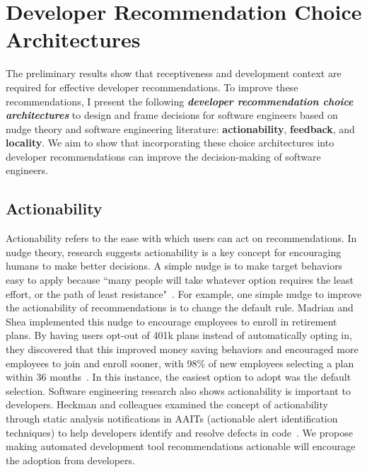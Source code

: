 \section{Developer Recommendation Choice Architectures}

The preliminary results show that receptiveness and development context are required for effective developer recommendations. To improve these recommendations, I present the following \textbf{\em developer recommendation choice architectures} to design and frame decisions for software engineers based on nudge theory and software engineering literature: \textbf{actionability}, \textbf{feedback}, and \textbf{locality}. We aim to show that incorporating these choice architectures into developer recommendations can improve the decision-making of software engineers.

\subsection{Actionability} Actionability refers to the ease with which users can act on recommendations. In nudge theory, research suggests actionability is a key concept for encouraging humans to make better decisions. A simple nudge is to make target behaviors easy to apply because ``many people will take whatever option requires the least effort, or the path of least resistance"~\cite[p.~85]{sunstein2008nudge}. For example, one simple nudge to improve the actionability of recommendations is to change the default rule. Madrian and Shea implemented this nudge to encourage employees to enroll in retirement plans. By having users opt-out of 401k plans instead of automatically opting in, they discovered that this improved money saving behaviors and encouraged more employees to join and enroll sooner, with 98\% of new employees selecting a plan within 36 months~\cite{madrian2001power}. In this instance, the easiest option to adopt was the default selection. Software engineering research also shows actionability is important to developers. Heckman and colleagues examined the concept of actionability through static analysis notifications in AAITs (actionable alert identification techniques) to help developers identify and resolve defects in code~\cite{HECKMAN2011363}. We propose making automated development tool recommendations actionable will encourage the adoption from developers.

